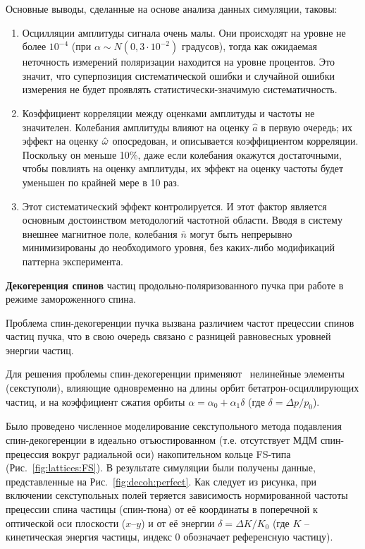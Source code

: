 Основные выводы, сделанные на основе анализа данных симуляции, таковы:
\begin{enumerate}
	\item Осцилляции амплитуды сигнала очень малы. Они происходят на уровне не более $10^{-4}$ (при
	${\alpha\sim N(0, 3\cdot 10^{-2})}$ градусов), тогда как ожидаемая неточность измерений поляризации находится
	на уровне процентов. Это значит, что суперпозиция систематической ошибки и случайной ошибки измерения
	не будет проявлять статистически-значимую систематичность.
	\item Коэффициент корреляции между оценками амплитуды и частоты не значителен. Колебания амплитуды
	влияют на оценку $\hat a$ в первую очередь; их эффект на оценку $\hat{\omega}$ опосредован, и описывается
	коэффициентом корреляции. Поскольку он меньше 10\%, даже если колебания окажутся достаточными, чтобы повлиять
	на оценку амплитуды, их эффект на оценку частоты будет уменьшен по крайней мере в 10 раз.
	\item Этот систематический эффект контролируется. И этот фактор является основным достоинством методологий
	частотной области. Вводя в систему внешнее магнитное поле,	колебания $\bar n$ могут быть 
	непрерывно минимизированы  до необходимого уровня, без каких-либо модификаций паттерна эксперимента.
\end{enumerate}

\textbf{Декогеренция спинов} частиц продольно-поляризованного пучка 
при работе в режиме замороженного спина.

Проблема спин-декогеренции пучка вызвана различием частот прецессии спинов частиц пучка, 
что в свою очередь связано с разницей равновесных уровней энергии частиц. 

Для решения проблемы спин-декогеренции применяют~\cite{COSY:SCT:IPAC15, COSY:SCT:1000sec} 
нелинейные элементы (секступоли), влияющие одновременно на длины орбит бетатрон-осциллирующих частиц,  
и на коэффициент сжатия орбиты ${\alpha = \alpha_0 + \alpha_1\delta}$ (где ${\delta=\Delta p/p_0}$).

Было проведено численное моделирование секступольного метода подавления спин-декогеренции 
в идеально отъюстированном (т.е. отсутствует МДМ спин-прецессия вокруг радиальной оси) накопительном кольце 
FS-типа (Рис.~\ref{fig:lattices:FS}). В результате симуляции были получены данные, представленные на Рис.~\ref{fig:decoh:perfect}. Как следует из рисунка, при включении секступольных полей теряется зависимость
нормированной частоты прецессии спина частицы (спин-тюна) от её координаты в поперечной к оптической оси
 плоскости ($x$--$y$) и от её энергии $\delta = \Delta K/K_0$ 
 (где $K$ -- кинетическая энергия частицы, индекс 0 обозначает референсную частицу).

